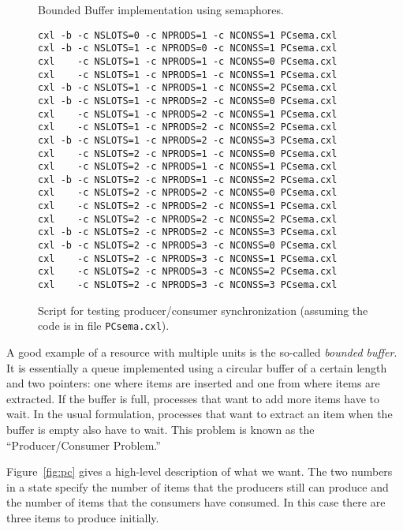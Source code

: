 \documentclass{report}
\newenvironment{code}{
\tcolorbox
}{
\endtcolorbox
}
\begin{document}
\begin{figure}
\begin{code}
\end{code}
\caption{Bounded Buffer implementation using semaphores.}
\label{fig:boundedbuffer}
\end{figure}

\begin{figure}
\begin{code}
\begin{verbatim}
cxl -b -c NSLOTS=0 -c NPRODS=1 -c NCONSS=1 PCsema.cxl
cxl -b -c NSLOTS=1 -c NPRODS=0 -c NCONSS=1 PCsema.cxl
cxl    -c NSLOTS=1 -c NPRODS=1 -c NCONSS=0 PCsema.cxl
cxl    -c NSLOTS=1 -c NPRODS=1 -c NCONSS=1 PCsema.cxl
cxl -b -c NSLOTS=1 -c NPRODS=1 -c NCONSS=2 PCsema.cxl
cxl -b -c NSLOTS=1 -c NPRODS=2 -c NCONSS=0 PCsema.cxl
cxl    -c NSLOTS=1 -c NPRODS=2 -c NCONSS=1 PCsema.cxl
cxl    -c NSLOTS=1 -c NPRODS=2 -c NCONSS=2 PCsema.cxl
cxl -b -c NSLOTS=1 -c NPRODS=2 -c NCONSS=3 PCsema.cxl
cxl    -c NSLOTS=2 -c NPRODS=1 -c NCONSS=0 PCsema.cxl
cxl    -c NSLOTS=2 -c NPRODS=1 -c NCONSS=1 PCsema.cxl
cxl -b -c NSLOTS=2 -c NPRODS=1 -c NCONSS=2 PCsema.cxl
cxl    -c NSLOTS=2 -c NPRODS=2 -c NCONSS=0 PCsema.cxl
cxl    -c NSLOTS=2 -c NPRODS=2 -c NCONSS=1 PCsema.cxl
cxl    -c NSLOTS=2 -c NPRODS=2 -c NCONSS=2 PCsema.cxl
cxl -b -c NSLOTS=2 -c NPRODS=2 -c NCONSS=3 PCsema.cxl
cxl -b -c NSLOTS=2 -c NPRODS=3 -c NCONSS=0 PCsema.cxl
cxl    -c NSLOTS=2 -c NPRODS=3 -c NCONSS=1 PCsema.cxl
cxl    -c NSLOTS=2 -c NPRODS=3 -c NCONSS=2 PCsema.cxl
cxl    -c NSLOTS=2 -c NPRODS=3 -c NCONSS=3 PCsema.cxl
\end{verbatim}
\end{code}
\caption{Script for testing producer/consumer synchronization
(assuming the code is in file \texttt{PCsema.cxl}).}
\label{fig:pcscript}
\end{figure}

A good example of a resource with multiple units is the so-called \emph{bounded buffer}.
It is essentially
a queue implemented using a circular buffer of a certain length and two pointers:
one where items are inserted and one from where items are extracted.  If the
buffer is full, processes that want to add more items have to wait.  In the usual
formulation, processes that want to extract an item when the buffer is empty
also have to wait.
This problem is known as the ``Producer/Consumer Problem.''

Figure~\ref{fig:pc} gives a high-level description of what we want.  The
two numbers in a state specify
the number of items that the producers still can produce and
the number of items that the consumers have consumed.  In this case
there are three items to produce initially.
\end{document}
